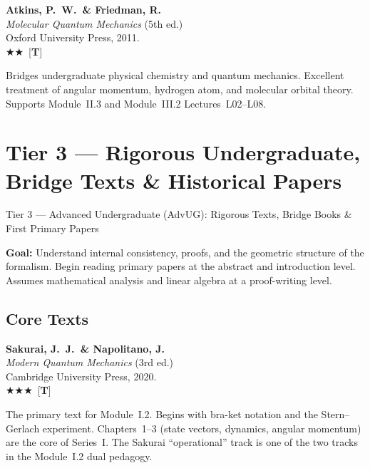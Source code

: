 \documentclass[11pt,a4paper]{article}
\newcommand{\essential}{$\bigstar\bigstar\bigstar$}
\newcommand{\recommended}{$\bigstar\bigstar$}
\newenvironment{bibentry}[1]{\begin{tcolorbox}[entrybox=#1,top=4pt,bottom=4pt]}{\end{tcolorbox}\smallskip}
\begin{document}
\begin{bibentry}{t2light}
\textbf{Atkins, P.~W.\ \& Friedman, R.}\\
\textit{Molecular Quantum Mechanics} (5th ed.)\\
Oxford University Press, 2011.\\[3pt]
\recommended\ [\textbf{T}]\\[3pt]
\begin{tcolorbox}[annotbox]
Bridges undergraduate physical chemistry and quantum mechanics. Excellent treatment
of angular momentum, hydrogen atom, and molecular orbital theory. Supports
Module~II.3 and Module~III.2 Lectures~L02--L08.
\end{tcolorbox}
\end{bibentry}

\newpage
\section{Tier 3 --- Rigorous Undergraduate, Bridge Texts \& Historical Papers}
\label{sec:t3}

\begin{tcolorbox}[tierheader=t3purple]
Tier 3 --- Advanced Undergraduate (AdvUG): Rigorous Texts, Bridge Books \& First Primary Papers
\end{tcolorbox}

\medskip
\begin{tcolorbox}[keybox]
\textbf{Goal:} Understand internal consistency, proofs, and the geometric structure
of the formalism. Begin reading primary papers at the abstract and introduction level.
Assumes mathematical analysis and linear algebra at a proof-writing level.
\end{tcolorbox}

\subsection{Core Texts}

\begin{bibentry}{t3light}
\textbf{Sakurai, J.~J.\ \& Napolitano, J.}\\
\textit{Modern Quantum Mechanics} (3rd ed.)\\
Cambridge University Press, 2020.\\[3pt]
\essential\ [\textbf{T}]\\[3pt]
\begin{tcolorbox}[annotbox]
The primary text for Module~I.2. Begins with bra-ket notation and the Stern--Gerlach
experiment. Chapters~1--3 (state vectors, dynamics, angular momentum) are the core of
Series~I. The Sakurai ``operational'' track is one of the two tracks in the Module~I.2
dual pedagogy.
\end{tcolorbox}
\end{bibentry}
\end{document}
